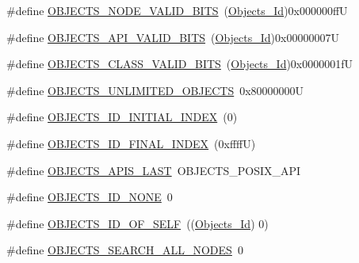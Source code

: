 \begin{DoxyCompactItemize}
\item 
\#define \mbox{\hyperlink{group__RTEMSScoreObject_gad7ba9def6f96d835fc64f8975ec62475}{O\+B\+J\+E\+C\+T\+S\+\_\+\+N\+O\+D\+E\+\_\+\+V\+A\+L\+I\+D\+\_\+\+B\+I\+TS}}~(\mbox{\hyperlink{group__RTEMSScoreObject_ga5821f52a51072941bdd603e542d0863e}{Objects\+\_\+\+Id}})0x000000ffU
\item 
\#define \mbox{\hyperlink{group__RTEMSScoreObject_ga583a79cd6454d84132d042c0d30aadb4}{O\+B\+J\+E\+C\+T\+S\+\_\+\+A\+P\+I\+\_\+\+V\+A\+L\+I\+D\+\_\+\+B\+I\+TS}}~(\mbox{\hyperlink{group__RTEMSScoreObject_ga5821f52a51072941bdd603e542d0863e}{Objects\+\_\+\+Id}})0x00000007U
\item 
\#define \mbox{\hyperlink{group__RTEMSScoreObject_ga694f359ec2d200239db58e29f17afdf5}{O\+B\+J\+E\+C\+T\+S\+\_\+\+C\+L\+A\+S\+S\+\_\+\+V\+A\+L\+I\+D\+\_\+\+B\+I\+TS}}~(\mbox{\hyperlink{group__RTEMSScoreObject_ga5821f52a51072941bdd603e542d0863e}{Objects\+\_\+\+Id}})0x0000001fU
\item 
\#define \mbox{\hyperlink{group__RTEMSScoreObject_ga2e39d2184f4f29e069ff679d9be47040}{O\+B\+J\+E\+C\+T\+S\+\_\+\+U\+N\+L\+I\+M\+I\+T\+E\+D\+\_\+\+O\+B\+J\+E\+C\+TS}}~0x80000000U
\item 
\#define \mbox{\hyperlink{group__RTEMSScoreObject_ga6aa91d4f58b2769c52ef2194fa6446e3}{O\+B\+J\+E\+C\+T\+S\+\_\+\+I\+D\+\_\+\+I\+N\+I\+T\+I\+A\+L\+\_\+\+I\+N\+D\+EX}}~(0)
\item 
\#define \mbox{\hyperlink{group__RTEMSScoreObject_gadec3b3e06c06eaa198708069b727aa77}{O\+B\+J\+E\+C\+T\+S\+\_\+\+I\+D\+\_\+\+F\+I\+N\+A\+L\+\_\+\+I\+N\+D\+EX}}~(0xffff\+U)
\item 
\#define \mbox{\hyperlink{group__RTEMSScoreObject_ga238bef3e73c68907c9fbc51497250c13}{O\+B\+J\+E\+C\+T\+S\+\_\+\+A\+P\+I\+S\+\_\+\+L\+A\+ST}}~O\+B\+J\+E\+C\+T\+S\+\_\+\+P\+O\+S\+I\+X\+\_\+\+A\+PI
\item 
\#define \mbox{\hyperlink{group__RTEMSScoreObject_ga39c027c946ce38b5a77192c60130a1de}{O\+B\+J\+E\+C\+T\+S\+\_\+\+I\+D\+\_\+\+N\+O\+NE}}~0
\item 
\#define \mbox{\hyperlink{group__RTEMSScoreObject_ga2454d6c322916168e6924f5ff26ab393}{O\+B\+J\+E\+C\+T\+S\+\_\+\+I\+D\+\_\+\+O\+F\+\_\+\+S\+E\+LF}}~((\mbox{\hyperlink{group__RTEMSScoreObject_ga5821f52a51072941bdd603e542d0863e}{Objects\+\_\+\+Id}}) 0)
\item 
\#define \mbox{\hyperlink{group__RTEMSScoreObject_ga248222b061dcc3e79288f92b86f4e297}{O\+B\+J\+E\+C\+T\+S\+\_\+\+S\+E\+A\+R\+C\+H\+\_\+\+A\+L\+L\+\_\+\+N\+O\+D\+ES}}~0
\item 

\end{DoxyCompactItemize}
